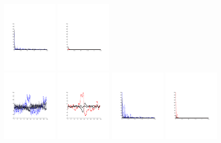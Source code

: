 \documentclass[12pt]{article}
\begin{document}
\begin{figure}[htb]
\includegraphics[width = 0.24\textwidth]{figures2/freq_before_2}
\includegraphics[width = 0.24\textwidth]{figures2/freq_after_2} \\
\includegraphics[width = 0.24\textwidth]{figures2/ts_before_3}
\includegraphics[width = 0.24\textwidth]{figures2/ts_after_3}
\includegraphics[width = 0.24\textwidth]{figures2/freq_before_3}
\includegraphics[width = 0.24\textwidth]{figures2/freq_after_3} \\

\end{figure}
\end{document}
